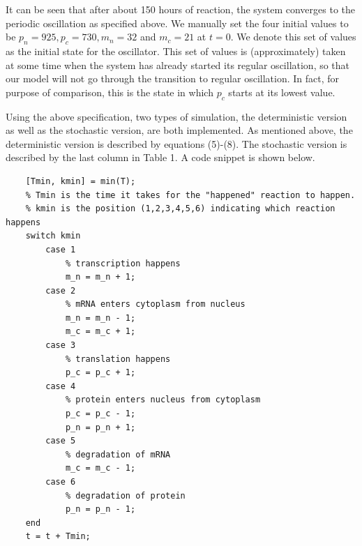 \documentclass[12pt]{article}
\renewcommand{\(}{\left (}
\renewcommand{\)}{\right )}
\begin{document}
It can be seen that after about 150 hours of reaction, the system converges to the periodic oscillation as specified above. We manually set the four initial values to be $p_n = 925, p_c = 730,m_n = 32$ and $m_c = 21$ at $t=0.$ We denote this set of values as the initial state for the oscillator. This set of values is (approximately) taken at some time when the system has already started its regular oscillation, so that our model will not go through the transition to regular oscillation. In fact, for purpose of comparison, this is the state in which $p_c$ starts at its lowest value.

Using the above specification, two types of simulation, the deterministic version as well as the stochastic version, are both implemented. As mentioned above, the deterministic version is described by equations (5)-(8). The stochastic version is described by the last column in Table 1. A code snippet is shown below.

\begin{lstlisting}
    [Tmin, kmin] = min(T);
    % Tmin is the time it takes for the "happened" reaction to happen.
    % kmin is the position (1,2,3,4,5,6) indicating which reaction happens
    switch kmin
        case 1
            % transcription happens
            m_n = m_n + 1;
        case 2
            % mRNA enters cytoplasm from nucleus
            m_n = m_n - 1;
            m_c = m_c + 1;
        case 3
            % translation happens
            p_c = p_c + 1;
        case 4
            % protein enters nucleus from cytoplasm
            p_c = p_c - 1;
            p_n = p_n + 1;
        case 5
            % degradation of mRNA
            m_c = m_c - 1;
        case 6
            % degradation of protein
            p_n = p_n - 1;
    end
    t = t + Tmin;
\end{lstlisting}
\end{document}
